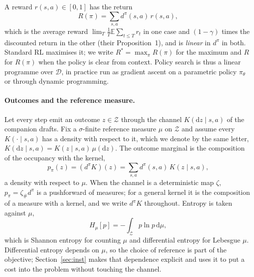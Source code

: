 \documentclass[11pt]{article}
\theoremstyle{remark}
\newcommand{\Zcal}{\mathcal Z}
\newcommand{\Dcal}{\mathcal D}
\newcommand{\E}{\mathbb E}
\newcommand{\1}{\mathds{1}}
\newcommand{\dd}{\mathrm d}
\newcommand{\occ}{d^{\pi}}
\newcommand{\pz}{p_{\pi}}
\newcommand{\Hf}[1]{H_{\mu}\!\left[#1\right]}
\begin{document}
A reward $r(s,a)\in[0,1]$ has the return
\begin{equation}
  R(\pi)=\sum_{s,a}\occ(s,a)\,r(s,a),
  \label{eq:return}
\end{equation}
which is the average reward $\lim_T\frac1T\E\sum_{t\le T}r_t$ in one case and $(1-\gamma)$ times the discounted return in the other (their Proposition~1), and is \emph{linear} in $\occ$ in both.
Standard RL maximises it; we write $R^\ast=\max_\pi R(\pi)$ for the maximum and $R$ for $R(\pi)$ when the policy is clear from context.
Policy search is thus a linear programme over $\Dcal$, in practice run as gradient ascent on a parametric policy $\pi_\theta$ or through dynamic programming.

\paragraph{Outcomes and the reference measure.}
Let every step emit an outcome $z\in\Zcal$ through the channel $K(\dd z\mid s,a)$ of the companion drafts.
{\color{blue!70!black}
Fix a $\sigma$-finite reference measure $\mu$ on $\Zcal$ and assume every $K(\cdot\mid s,a)$ has a density with respect to it, which we denote by the same letter, $K(\dd z\mid s,a)=K(z\mid s,a)\,\mu(\dd z)$.
The outcome marginal is the composition of the occupancy with the kernel,
\begin{equation}
  \pz(z)=(\occ K)(z)=\sum_{s,a}\occ(s,a)\,K(z\mid s,a),
  \label{eq:push}
\end{equation}
a density with respect to $\mu$. When the channel is a deterministic map $\zeta$, $\pz=\zeta_{\#}\occ$ is a pushforward of measures; for a general kernel it is the composition of a measure with a kernel, and we write $\occ K$ throughout.
Entropy is taken against $\mu$,
\begin{equation}
  \Hf{p}=-\int_{\Zcal} p\ln p\,\dd\mu ,
  \label{eq:ent}
\end{equation}
which is Shannon entropy for counting $\mu$ and differential entropy for Lebesgue $\mu$.
Differential entropy depends on $\mu$, so the choice of reference is part of the objective; Section~\ref{sec:inst} makes that dependence explicit and uses it to put a cost into the problem without touching the channel.
}
\end{document}

